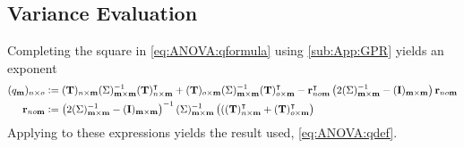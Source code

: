 \documentclass[a4paper, margin=1in, reqno]{RAMArticle}
\begin{document}
	\subsection{Variance Evaluation}
		Completing the square in \cref{eq:ANOVA:qformula} using \cref{sub:App:GPR} yields an exponent
		\begin{align*}
			(q_\mathbf{m})_{n\times o}
			&\mathrel{\mathop:}= (\mathbf{T})_{n\times\mathbf{m}} (\Sigma)_{\mathbf{m}\times\mathbf{m}}^{-1} (\mathbf{T})_{n\times\mathbf{m}}^{\intercal}
			+ (\mathbf{T})_{o\times\mathbf{m}} (\Sigma)_{\mathbf{m}\times\mathbf{m}}^{-1} (\mathbf{T})_{o\times\mathbf{m}}^{\intercal} - 
			\mathbf{r}_{no\mathbf{m}}^{\intercal} \left(2(\Sigma)_{\mathbf{m} \times \mathbf{m}}^{-1} - (\mathbf{I})_{\mathbf{m} \times \mathbf{m}}\right) \mathbf{r}_{no\mathbf{m}} \\
			\mathbf{r}_{no\mathbf{m}}
			&\mathrel{\mathop:}= 
			\left(2(\Sigma)_{\mathbf{m} \times \mathbf{m}}^{-1} - (\mathbf{I})_{\mathbf{m} \times \mathbf{m}}\right)^{-1}(\Sigma)_{\mathbf{m} \times \mathbf{m}}^{-1} 
			\left(((\mathbf{T})_{n\times\mathbf{m}}^{\intercal} + (\mathbf{T})_{o\times\mathbf{m}}^{\intercal}\right)
		\end{align*}
		Applying  to these expressions yields the result used, \cref{eq:ANOVA:qdef}.



\end{document}
